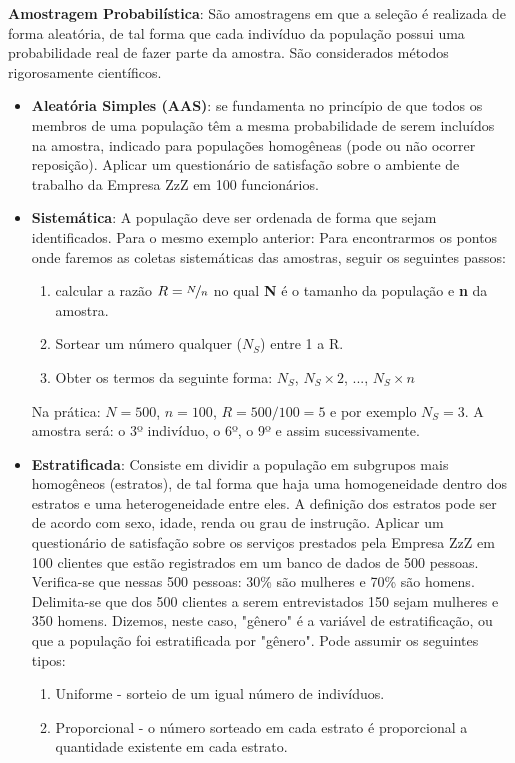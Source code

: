 \documentclass[a4paper,11pt]{article}
\begin{document}
\textbf{Amostragem Probabilística}: São amostragens em que a seleção é realizada de forma aleatória, de tal forma que cada indivíduo da população possui uma probabilidade real de fazer parte da amostra. São considerados métodos rigorosamente científicos.
\begin{itemize}
	\item \textbf{Aleatória Simples (AAS)}: se fundamenta no princípio de que todos os membros de uma população têm a mesma probabilidade de serem incluídos na amostra, indicado para populações homogêneas (pode ou não ocorrer reposição). Aplicar um questionário de satisfação sobre o ambiente de trabalho da Empresa ZzZ em 100 funcionários.
	\item \textbf{Sistemática}: A população deve ser ordenada de forma que sejam identificados. Para o mesmo exemplo anterior: Para encontrarmos os pontos onde faremos as coletas sistemáticas das amostras, seguir os seguintes passos:
	\begin{enumerate}
		\item calcular a razão $R = \nicefrac{N}{n}$ no qual \textbf{N} é o tamanho da população e \textbf{n} da amostra.
		\item Sortear um número qualquer ($N_{S}$) entre 1 a R.
		\item Obter os termos da seguinte forma: $N_{S}$, $N_{S} \times 2$, ..., $N_{S} \times n$
	\end{enumerate}
	Na prática: $N = 500$, $n = 100$, $R = 500/100 = 5$ e por exemplo $N_{S} = 3$. A amostra será: o 3º indivíduo, o 6º, o 9º e assim sucessivamente.
	\item \textbf{Estratificada}: Consiste em dividir a população em subgrupos mais homogêneos (estratos), de tal forma que haja uma homogeneidade dentro dos estratos e uma heterogeneidade entre eles. A definição dos estratos pode ser de acordo com sexo, idade, renda ou grau de instrução. Aplicar um questionário de satisfação sobre os serviços prestados pela Empresa ZzZ em 100 clientes que estão registrados em um banco de dados de 500 pessoas. Verifica-se que nessas 500 pessoas: 30\% são mulheres e 70\% são homens. Delimita-se que dos 500 clientes a serem entrevistados 150 sejam mulheres e 350 homens. Dizemos, neste caso, "gênero" é a variável de estratificação, ou que a população foi estratificada por "gênero". Pode assumir os seguintes tipos:
	\begin{enumerate}
		\item Uniforme - sorteio de um igual número de indivíduos.
		\item Proporcional - o número sorteado em cada estrato é proporcional a quantidade existente em cada estrato.

\end{enumerate}
\end{itemize}
\end{document}
